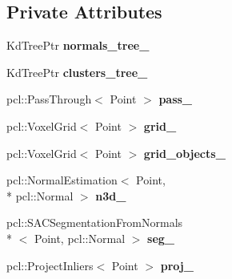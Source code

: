 \subsection*{Private Attributes}
\begin{DoxyCompactItemize}
\item 
\hypertarget{classope_1_1_table_object_detector_a71a7a4622f3e33b8a24eb41fe8145980}{Kd\-Tree\-Ptr {\bfseries normals\-\_\-tree\-\_\-}}\label{classope_1_1_table_object_detector_a71a7a4622f3e33b8a24eb41fe8145980}

\item 
\hypertarget{classope_1_1_table_object_detector_a8747834005eca501c1e1cc122cc07b4f}{Kd\-Tree\-Ptr {\bfseries clusters\-\_\-tree\-\_\-}}\label{classope_1_1_table_object_detector_a8747834005eca501c1e1cc122cc07b4f}

\item 
\hypertarget{classope_1_1_table_object_detector_a5d442571732be136084623aebc613443}{pcl\-::\-Pass\-Through$<$ Point $>$ {\bfseries pass\-\_\-}}\label{classope_1_1_table_object_detector_a5d442571732be136084623aebc613443}

\item 
\hypertarget{classope_1_1_table_object_detector_afdba8d86851b3f3b084c05075763926c}{pcl\-::\-Voxel\-Grid$<$ Point $>$ {\bfseries grid\-\_\-}}\label{classope_1_1_table_object_detector_afdba8d86851b3f3b084c05075763926c}

\item 
\hypertarget{classope_1_1_table_object_detector_aba39fa3538d7c9dd85ac204f01441afe}{pcl\-::\-Voxel\-Grid$<$ Point $>$ {\bfseries grid\-\_\-objects\-\_\-}}\label{classope_1_1_table_object_detector_aba39fa3538d7c9dd85ac204f01441afe}

\item 
\hypertarget{classope_1_1_table_object_detector_a02b8389a3f15a5e417e53ef25733c04c}{pcl\-::\-Normal\-Estimation$<$ Point, \\*
pcl\-::\-Normal $>$ {\bfseries n3d\-\_\-}}\label{classope_1_1_table_object_detector_a02b8389a3f15a5e417e53ef25733c04c}

\item 
\hypertarget{classope_1_1_table_object_detector_a55a4449206dc7555ab35de306fd91a5b}{pcl\-::\-S\-A\-C\-Segmentation\-From\-Normals\\*
$<$ Point, pcl\-::\-Normal $>$ {\bfseries seg\-\_\-}}\label{classope_1_1_table_object_detector_a55a4449206dc7555ab35de306fd91a5b}

\item 
\hypertarget{classope_1_1_table_object_detector_a2b13db7cc8c66416c14f9b1da2ca6bff}{pcl\-::\-Project\-Inliers$<$ Point $>$ {\bfseries proj\-\_\-}}\label{classope_1_1_table_object_detector_a2b13db7cc8c66416c14f9b1da2ca6bff}


\end{DoxyCompactItemize}
